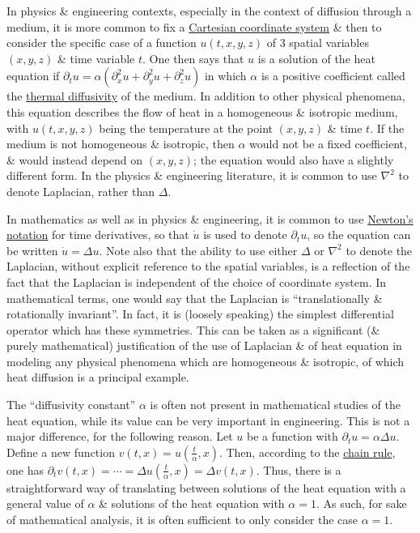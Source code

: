 \documentclass{article}
\begin{document}
In physics \& engineering contexts, especially in the context of diffusion through a medium, it is more common to fix a \href{https://en.wikipedia.org/wiki/Cartesian_coordinate_system}{Cartesian coordinate system} \& then to consider the specific case of a function $u(t,x,y,z)$ of 3 spatial variables $(x,y,z)$ \& time variable $t$. One then says that $u$ is a solution of the heat equation if $\partial_tu = \alpha(\partial_x^2u + \partial_y^2u + \partial_z^2u)$ in which $\alpha$ is a positive coefficient called the \href{https://en.wikipedia.org/wiki/Thermal_diffusivity}{thermal diffusivity} of the medium. In addition to other physical phenomena, this equation describes the flow of heat in a homogeneous \& isotropic medium, with $u(t,x,y,z)$ being the temperature at the point $(x,y,z)$ \& time $t$. If the medium is not homogeneous \& isotropic, then $\alpha$ would not be a fixed coefficient, \& would instead depend on $(x,y,z)$; the equation would also have a slightly different form. In the physics \& engineering literature, it is common to use $\nabla^2$ to denote Laplacian, rather than $\Delta$.

In mathematics as well as in physics \& engineering, it is common to use \href{https://en.wikipedia.org/wiki/Newton%27s_notation}{Newton's notation} for time derivatives, so that $\dot{u}$ is used to denote $\partial_tu$, so the equation can be written $\dot{u} = \Delta u$. Note also that the ability to use either $\Delta$ or $\nabla^2$ to denote the Laplacian, without explicit reference to the spatial variables, is a reflection of the fact that the Laplacian is independent of the choice of coordinate system. In mathematical terms, one would say that the Laplacian is ``translationally \& rotationally invariant''. In fact, it is (loosely speaking) the simplest differential operator which has these symmetries. This can be taken as a significant (\& purely mathematical) justification of the use of Laplacian \& of heat equation in modeling any physical phenomena which are homogeneous \& isotropic, of which heat diffusion is a principal example.

The ``diffusivity constant'' $\alpha$ is often not present in mathematical studies of the heat equation, while its value can be very important in engineering. This is not a major difference, for the following reason. Let $u$ be a function with $\partial_tu = \alpha\Delta u$. Define a new function $v(t,x) = u(\frac{t}{\alpha},x)$. Then, according to the \href{https://en.wikipedia.org/wiki/Chain_rule}{chain rule}, one has $\partial_tv(t,x) = \cdots = \Delta u(\frac{t}{\alpha},x) = \Delta v(t,x)$. Thus, there is a straightforward way of translating between solutions of the heat equation with a general value of $\alpha$ \& solutions of the heat equation with $\alpha = 1$. As such, for sake of mathematical analysis, it is often sufficient to only consider the case $\alpha = 1$.
\end{document}
